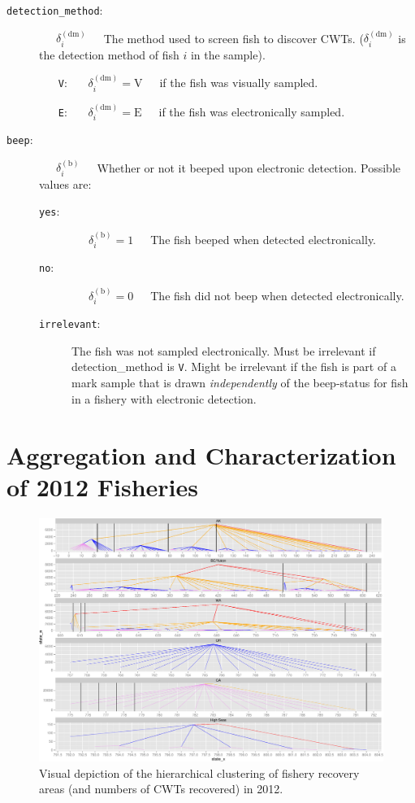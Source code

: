 \documentclass[11pt]{article}
\begin{document}
\begin{description}
	\item [{\tt detection\_method}:] ~~~$\delta_i^{(\mathrm{dm})}$~~~The method used to screen fish to discover CWTs. ($\delta_i^{(\mathrm{dm})}$ is the detection method of fish $i$ in the sample).
	\begin{itemize}
		\item [{\tt V}:] ~~~$\delta_i^{(\mathrm{dm})} = \mathrm{V}$~~~if the fish was visually sampled.
		\item [{\tt E}:] ~~~$\delta_i^{(\mathrm{dm})} = \mathrm{E}$~~~if the fish was electronically sampled.
	\end{itemize}
	\item [{\tt beep}:] ~~~$\delta_i^{(\mathrm{b})}$~~~Whether or not it beeped upon electronic detection. Possible values are:
	\begin{description}
		\item [{\tt yes}:] ~~~$\delta_i^{(\mathrm{b})} = 1$~~~The fish beeped when detected electronically.
		\item [{\tt no}:]  ~~~$\delta_i^{(\mathrm{b})} = 0$~~~The fish did not beep when detected electronically.
		\item [{\tt irrelevant}:] The fish was not sampled electronically.
		Must be irrelevant if detection\_method is {\tt V}. Might be irrelevant if the fish is part of a
		mark sample that is drawn {\em independently} of the beep-status for fish in a fishery with
		electronic detection.
	\end{description}

\end{description}

\section{Aggregation and Characterization of 2012 Fisheries \label{sec:agg}}

\begin{figure}
\begin{center}
\includegraphics[width=\textwidth]{images/recovery_trees_divided.pdf}
\end{center}
\caption{Visual depiction of the hierarchical clustering of fishery recovery areas (and numbers of CWTs recovered)
in 2012.}
\end{figure}
\end{document}
